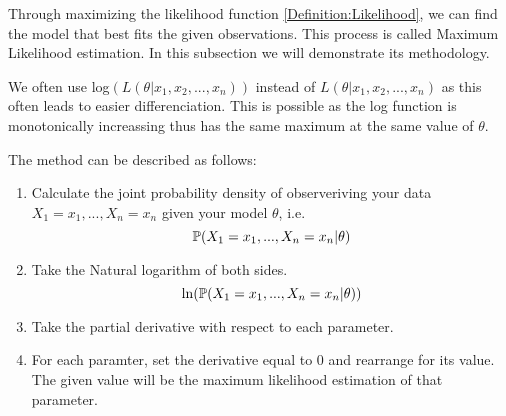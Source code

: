     Through maximizing the likelihood function \ref{Definition:Likelihood}, we can find the model that best fits the given observations. This process is called Maximum Likelihood estimation. In this subsection we will demonstrate its methodology.

    We often use log$(L(\theta|x_1, x_2,...,x_n))$ instead of $L(\theta|x_1, x_2,...,x_n)$ as this often leads to easier differenciation. This is possible as the log function is monotonically increassing thus has the same maximum at the same value of $\theta$.

    The method can be described as follows:
    \begin{enumerate}[i]
        \label{Model_Selection:Maximum_Liklihood_Estimators:MLE:Method}
        \item Calculate the joint probability density of observeriving your data $X_1 = x_1,...,X_n=x_n$ given your model $\theta$, i.e.
        \begin{equation}
            \mathbb{P}(X_1 = x_1,...,X_n=x_n|\theta)
        \end{equation}
        \item Take the Natural logarithm of both sides. 
        \begin{equation}
            \ln(\mathbb{P}(X_1 = x_1,...,X_n=x_n|\theta))
        \end{equation}
        \item Take the partial derivative with respect to each parameter.
        \item For each paramter, set the derivative equal to 0 and rearrange for its value. The given value will be the maximum likelihood estimation of that parameter.
    \end{enumerate}

